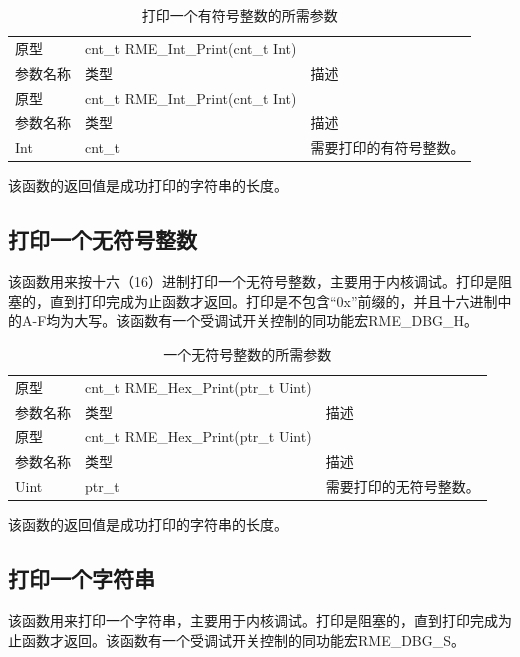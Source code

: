 \begin{xltabular}{\textwidth}{@{}>{\hsize\raggedright\arraybackslash}X>{\hsize\raggedright\arraybackslash}X>{\hsize\raggedright\arraybackslash}X@{}}
\caption{打印一个有符号整数的所需参数}\label{tab:7-88-print-signed-integer-parameters}\\
\toprule
原型 & cnt\_t RME\_Int\_Print(cnt\_t Int) &\tabularnewline
参数名称 & 类型 & 描述\tabularnewline
\endfirsthead
\toprule
原型 & cnt\_t RME\_Int\_Print(cnt\_t Int) &\tabularnewline
参数名称 & 类型 & 描述\tabularnewline
\midrule
\endhead
\bottomrule
\endlastfoot
Int & cnt\_t & 需要打印的有符号整数。\tabularnewline
\end{xltabular}

该函数的返回值是成功打印的字符串的长度。

\subsection{打印一个无符号整数}\label{subsec:7-print-unsigned-integer}

该函数用来按十六（16）进制打印一个无符号整数，主要用于内核调试。打印是阻塞的，直到打印完成为止函数才返回。打印是不包含``0x''前缀的，并且十六进制中的A-F均为大写。该函数有一个受调试开关控制的同功能宏RME\_DBG\_H。

\begin{xltabular}{\textwidth}{@{}>{\hsize\raggedright\arraybackslash}X>{\hsize\raggedright\arraybackslash}X>{\hsize\raggedright\arraybackslash}X@{}}
\caption{一个无符号整数的所需参数}\label{tab:7-89-print-unsigned-integer-parameters}\\
\toprule
原型 & cnt\_t RME\_Hex\_Print(ptr\_t Uint) &\tabularnewline
参数名称 & 类型 & 描述\tabularnewline
\endfirsthead
\toprule
原型 & cnt\_t RME\_Hex\_Print(ptr\_t Uint) &\tabularnewline
参数名称 & 类型 & 描述\tabularnewline
\midrule
\endhead
\bottomrule
\endlastfoot
Uint & ptr\_t & 需要打印的无符号整数。\tabularnewline
\end{xltabular}

该函数的返回值是成功打印的字符串的长度。

\subsection{打印一个字符串}\label{subsec:7-print-string}

该函数用来打印一个字符串，主要用于内核调试。打印是阻塞的，直到打印完成为止函数才返回。该函数有一个受调试开关控制的同功能宏RME\_DBG\_S。

